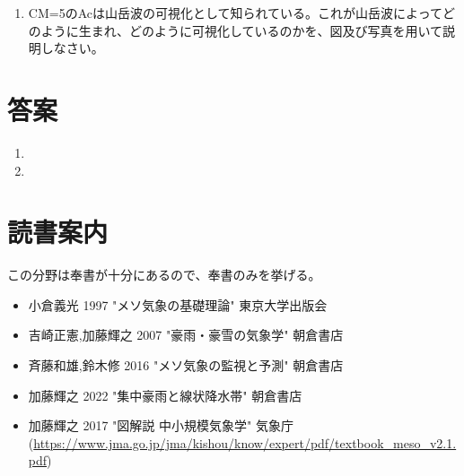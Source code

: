 \documentclass{jsarticle}
\newenvironment{problems}
{
  \renewcommand\labelenumi{\doublebox{\arabic{enumi}}}
  \begin{enumerate}
}{
  \end{enumerate}
  \renewcommand\labelenumi{\arabic{enumi}.}
}
\begin{document}
\begin{problems}
    \item CM=5のAcは山岳波の可視化として知られている。これが山岳波によってどのように生まれ、どのように可視化しているのかを、図及び写真を用いて説明しなさい。
    \end{problems}

\section{答案}
\begin{problems}
\item 

\item 


\end{problems}

\section{読書案内}
この分野は奉書が十分にあるので、奉書のみを挙げる。
\begin{itemize}
\item 小倉義光 1997 "メソ気象の基礎理論" 東京大学出版会
\item 吉崎正憲,加藤輝之 2007 "豪雨・豪雪の気象学" 朝倉書店
\item 斉藤和雄,鈴木修 2016 "メソ気象の監視と予測" 朝倉書店
\item 加藤輝之 2022 "集中豪雨と線状降水帯" 朝倉書店
\item 加藤輝之 2017 "図解説 中小規模気象学" 気象庁 (\url{https://www.jma.go.jp/jma/kishou/know/expert/pdf/textbook_meso_v2.1.pdf})
\end{itemize}
\end{document}
